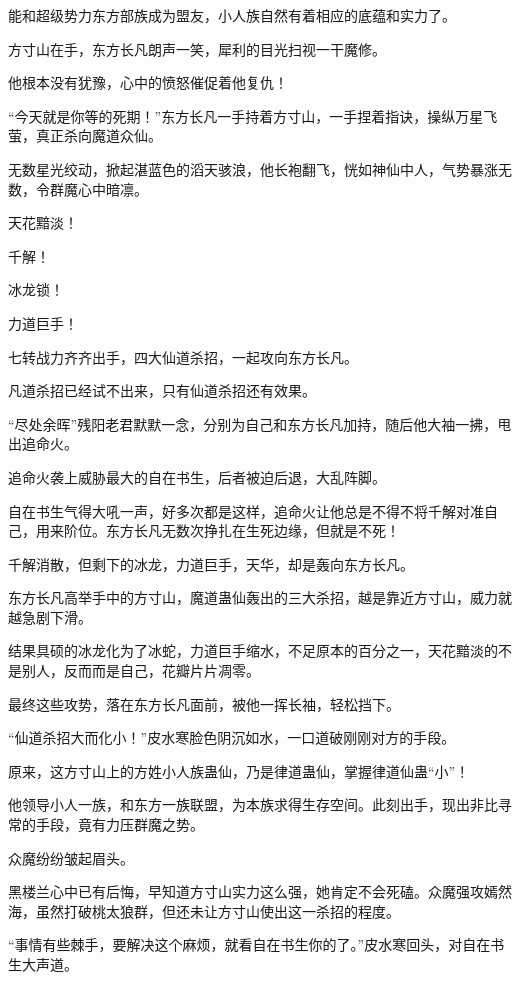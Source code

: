\begin{this_body}
能和超级势力东方部族成为盟友，小人族自然有着相应的底蕴和实力了。

方寸山在手，东方长凡朗声一笑，犀利的目光扫视一干魔修。

他根本没有犹豫，心中的愤怒催促着他复仇！

“今天就是你等的死期！”东方长凡一手持着方寸山，一手捏着指诀，操纵万星飞萤，真正杀向魔道众仙。

无数星光绞动，掀起湛蓝色的滔天骇浪，他长袍翻飞，恍如神仙中人，气势暴涨无数，令群魔心中暗凛。

天花黯淡！

千解！

冰龙锁！

力道巨手！

七转战力齐齐出手，四大仙道杀招，一起攻向东方长凡。

凡道杀招已经试不出来，只有仙道杀招还有效果。

“尽处余晖”残阳老君默默一念，分别为自己和东方长凡加持，随后他大袖一拂，甩出追命火。

追命火袭上威胁最大的自在书生，后者被迫后退，大乱阵脚。

自在书生气得大吼一声，好多次都是这样，追命火让他总是不得不将千解对准自己，用来阶位。东方长凡无数次挣扎在生死边缘，但就是不死！

千解消散，但剩下的冰龙，力道巨手，天华，却是轰向东方长凡。

东方长凡高举手中的方寸山，魔道蛊仙轰出的三大杀招，越是靠近方寸山，威力就越急剧下滑。

结果具硕的冰龙化为了冰蛇，力道巨手缩水，不足原本的百分之一，天花黯淡的不是别人，反而而是自己，花瓣片片凋零。

最终这些攻势，落在东方长凡面前，被他一挥长袖，轻松挡下。

“仙道杀招大而化小！”皮水寒脸色阴沉如水，一口道破刚刚对方的手段。

原来，这方寸山上的方姓小人族蛊仙，乃是律道蛊仙，掌握律道仙蛊“小”！

他领导小人一族，和东方一族联盟，为本族求得生存空间。此刻出手，现出非比寻常的手段，竟有力压群魔之势。

众魔纷纷皱起眉头。

黑楼兰心中已有后悔，早知道方寸山实力这么强，她肯定不会死磕。众魔强攻嫣然海，虽然打破桃太狼群，但还未让方寸山使出这一杀招的程度。

“事情有些棘手，要解决这个麻烦，就看自在书生你的了。”皮水寒回头，对自在书生大声道。


\end{this_body}
